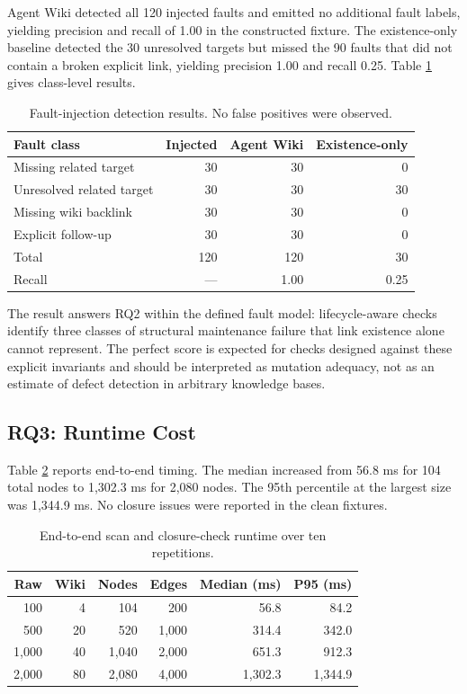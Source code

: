 \documentclass[preprint,12pt,a4paper]{elsarticle}
\begin{document}
Agent Wiki detected all 120 injected faults and emitted no additional fault
labels, yielding precision and recall of 1.00 in the constructed fixture. The
existence-only baseline detected the 30 unresolved targets but missed the 90
faults that did not contain a broken explicit link, yielding precision 1.00 and
recall 0.25. Table \ref{tab:faultresults} gives class-level results.

\begin{table}[H]
\centering
\small
\begin{tabular}{lrrr}
\toprule
Fault class & Injected & Agent Wiki & Existence-only \\
\midrule
Missing related target & 30 & 30 & 0 \\
Unresolved related target & 30 & 30 & 30 \\
Missing wiki backlink & 30 & 30 & 0 \\
Explicit follow-up & 30 & 30 & 0 \\
\midrule
Total & 120 & 120 & 30 \\
Recall & --- & 1.00 & 0.25 \\
\bottomrule
\end{tabular}
\caption{Fault-injection detection results. No false positives were observed.}
\label{tab:faultresults}
\end{table}

The result answers RQ2 within the defined fault model: lifecycle-aware checks
identify three classes of structural maintenance failure that link existence
alone cannot represent. The perfect score is expected for checks designed
against these explicit invariants and should be interpreted as mutation
adequacy, not as an estimate of defect detection in arbitrary knowledge bases.

\subsection{RQ3: Runtime Cost}

Table \ref{tab:runtime} reports end-to-end timing. The median increased from
56.8 ms for 104 total nodes to 1,302.3 ms for 2,080 nodes. The 95th percentile
at the largest size was 1,344.9 ms. No closure issues were reported in the
clean fixtures.

\begin{table}[H]
\centering
\small
\begin{tabular}{rrrrrr}
\toprule
Raw & Wiki & Nodes & Edges & Median (ms) & P95 (ms) \\
\midrule
100 & 4 & 104 & 200 & 56.8 & 84.2 \\
500 & 20 & 520 & 1,000 & 314.4 & 342.0 \\
1,000 & 40 & 1,040 & 2,000 & 651.3 & 912.3 \\
2,000 & 80 & 2,080 & 4,000 & 1,302.3 & 1,344.9 \\
\bottomrule
\end{tabular}
\caption{End-to-end scan and closure-check runtime over ten repetitions.}
\label{tab:runtime}
\end{table}
\end{document}
